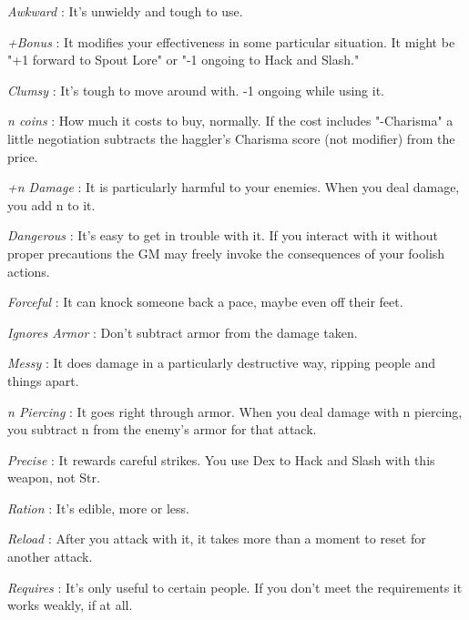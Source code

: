  

{\em Awkward} : It's unwieldy and tough to use. 

 

{\em +Bonus} : It modifies your effectiveness in some particular situation. It might be "+1 forward to Spout Lore" or "-1 ongoing to Hack and Slash."

 

{\em Clumsy} : It's tough to move around with. -1 ongoing while using it.

 

{\em n coins} : How much it costs to buy, normally. If the cost includes "-Charisma" a little negotiation subtracts the haggler's Charisma score (not modifier) from the price.

 

{\em +n Damage} : It is particularly harmful to your enemies. When you deal damage, you add n to it.

 

{\em Dangerous} : It's easy to get in trouble with it. If you interact with it without proper precautions the GM may freely invoke the consequences of your foolish actions.

 

{\em Forceful} : It can knock someone back a pace, maybe even off their feet. 

 

{\em Ignores Armor} : Don't subtract armor from the damage taken.

 

{\em Messy} : It does damage in a particularly destructive way, ripping people and things apart.

 

{\em n Piercing} : It goes right through armor. When you deal damage with n piercing, you subtract n from the enemy's armor for that attack. 

 

{\em Precise} : It rewards careful strikes. You use Dex to Hack and Slash with this weapon, not Str.

 

{\em Ration} : It's edible, more or less.

 

{\em Reload} : After you attack with it, it takes more than a moment to reset for another attack. 

 

{\em Requires} : It's only useful to certain people. If you don't meet the requirements it works weakly, if at all.

